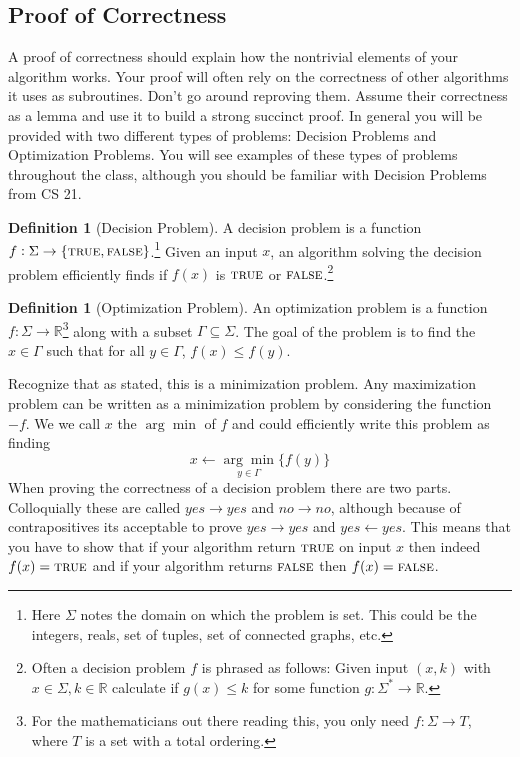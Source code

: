 \documentclass[10pt]{article}
\theoremstyle{plain}
\theoremstyle{definition}
\newtheorem{defn}[thm]{Definition} %
\newcommand{\RR}{\mathbb{R}}
\newcommand{\short}[1]{\mbox{\sc #1}}
\newcommand{\true}{\short{true}}
\newcommand{\false}{\short{false}}
\numberwithin{equation}{section}
\numberwithin{figure}{section}
\begin{document}
\subsection{Proof of Correctness}
A proof of correctness should explain how the nontrivial elements of your algorithm works. Your proof will often rely on the correctness of other algorithms it uses as subroutines. Don't go around reproving them. Assume their correctness as a lemma and use it to build a strong succinct proof. In general you will be provided with two different types of problems: Decision Problems and Optimization Problems. You will see examples of these types of problems throughout the class, although you should be familiar with Decision Problems from CS 21.

\begin{defn}[Decision Problem]
A decision problem is a function $f : \Sigma \rightarrow \{\true, \false\}$.\footnote{Here $\Sigma$ notes the domain on which the problem is set. This could be the integers, reals, set of tuples, set of connected graphs, etc.} Given an input $x$, an algorithm solving the decision problem efficiently finds if $f(x)$ is $\true$ or $\false$.\footnote{ Often a decision problem $f$ is phrased as follows: Given input $(x,k)$ with $x \in \Sigma, k \in \RR$  calculate if $g(x) \leq k$ for some function $g: \Sigma^* \rightarrow \RR$.}
\end{defn}

\begin{defn}[Optimization Problem]
An optimization problem is a function $f : \Sigma \rightarrow \RR$\footnote{For the mathematicians out there reading this, you only need $f: \Sigma \rightarrow T$, where $T$ is a set with a total ordering.} along with a subset $\Gamma \subseteq \Sigma$. The goal of the problem is to find the $x \in \Gamma$ such that for all $y \in \Gamma$, $f(x) \leq f(y)$. 
\end{defn}

\noindent Recognize that as stated, this is a minimization problem. Any maximization problem can be written as a minimization problem by considering the function $-f$. We we call $x$ the $\arg \min$ of $f$ and could efficiently write this problem as finding
\begin{equation}
x \leftarrow \underset{y \in \Gamma}{\arg \min} \{f(y) \}
\end{equation}
When proving the correctness of a decision problem there are two parts. Colloquially these are called $yes \rightarrow yes$ and $no \rightarrow no$, although because of contrapositives its acceptable to prove $yes \rightarrow yes$ and $yes \leftarrow yes$. This means that you have to show that if your algorithm return $\true$ on input $x$ then indeed $f(x) = \true$ and if your algorithm returns $\false$ then $f(x) = \false$. \\
\end{document}
